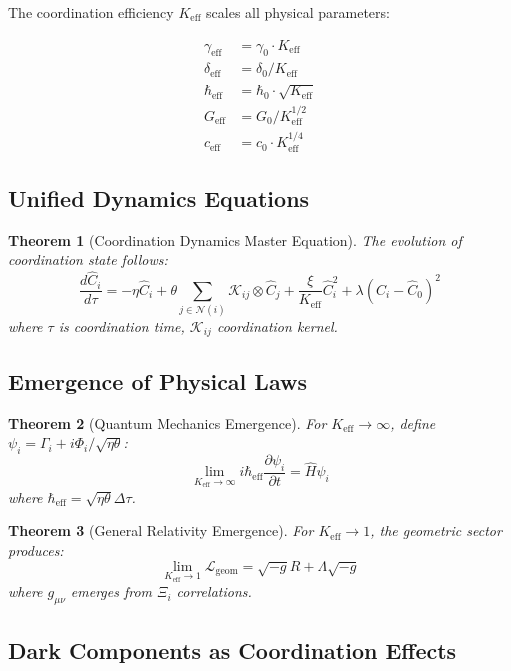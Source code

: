 \documentclass[11pt,a4paper]{article}
\newtheorem{theorem}{Theorem}
\begin{document}
The coordination efficiency $K_{\mathrm{eff}}$ scales all physical parameters:

\[
\begin{aligned}
	\gamma_{\mathrm{eff}} &= \gamma_0 \cdot K_{\mathrm{eff}} \\
	\delta_{\mathrm{eff}} &= \delta_0 / K_{\mathrm{eff}} \\
	\hbar_{\mathrm{eff}} &= \hbar_0 \cdot \sqrt{K_{\mathrm{eff}}} \\
	G_{\mathrm{eff}} &= G_0 / K_{\mathrm{eff}}^{1/2} \\
	c_{\mathrm{eff}} &= c_0 \cdot K_{\mathrm{eff}}^{1/4}
\end{aligned}
\]

\subsection{Unified Dynamics Equations}

\begin{theorem}[Coordination Dynamics Master Equation]
	The evolution of coordination state follows:
	\[
	\frac{d\hat{C}_i}{d\tau} = -\eta \hat{C}_i + \theta \sum_{j \in \mathcal{N}(i)} \mathcal{K}_{ij} \otimes \hat{C}_j + \frac{\xi}{K_{\mathrm{eff}}} \hat{C}_i^2 + \lambda (\hat{C}_i - \hat{C}_0)^2
	\]
	where $\tau$ is coordination time, $\mathcal{K}_{ij}$ coordination kernel.
\end{theorem}

\subsection{Emergence of Physical Laws}

\begin{theorem}[Quantum Mechanics Emergence]
	For $K_{\mathrm{eff}} \to \infty$, define $\psi_i = \Gamma_i + i\Phi_i/\sqrt{\eta\theta}$:
	\[
	\lim_{K_{\mathrm{eff}} \to \infty} i\hbar_{\mathrm{eff}}\frac{\partial\psi_i}{\partial t} = \hat{H}\psi_i
	\]
	where $\hbar_{\mathrm{eff}} = \sqrt{\eta\theta}\Delta\tau$.
\end{theorem}

\begin{theorem}[General Relativity Emergence]  
	For $K_{\mathrm{eff}} \to 1$, the geometric sector produces:
	\[
	\lim_{K_{\mathrm{eff}} \to 1} \mathcal{L}_{\mathrm{geom}} = \sqrt{-g}R + \Lambda\sqrt{-g}
	\]
	where $g_{\mu\nu}$ emerges from $\Xi_i$ correlations.
\end{theorem}

\subsection{Dark Components as Coordination Effects}
\end{document}
